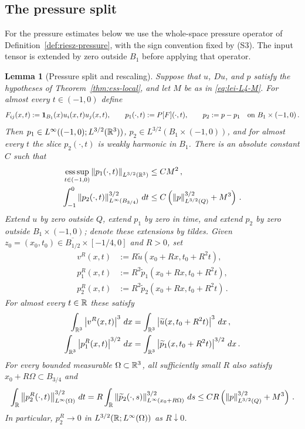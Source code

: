 \documentclass[11pt,letterpaper]{article}
\numberwithin{equation}{section}
\theoremstyle{plain}
\newtheorem{lemma}[theorem]{Lemma}
\theoremstyle{definition}
\theoremstyle{remark}
\begin{document}
\subsection{The pressure split}

For the pressure estimates below we use the whole-space pressure operator of Definition~\ref{def:riesz-pressure}, with the sign convention fixed by (S3). The input tensor is extended by zero outside $B_1$ before applying that operator.

\begin{lemma}[Pressure split and rescaling]\label{lem:pressure-split}
Suppose that $u$, $Du$, and $p$ satisfy the hypotheses of Theorem~\ref{thm:ess-local}, and let $M$ be as in \eqref{eq:lei-L4-M}. For almost every $t\in(-1,0)$ define
\begin{equation}\label{eq:pressure-split-defs}
F_{ij}(x,t):=\mathbf1_{B_1}(x)u_i(x,t)u_j(x,t),\qquad
p_1(\cdot,t):=P[F](\cdot,t),\qquad
p_2:=p-p_1\quad\hbox{on }B_1\times(-1,0)\,.
\end{equation}
Then $p_1\in L^\infty((-1,0);L^{3/2}(\mathbb{R}^3))$, $p_2\in L^{3/2}(B_1\times(-1,0))$, and for almost every $t$ the slice $p_2(\cdot,t)$ is weakly harmonic in $B_1$. There is an absolute constant $C$ such that
\begin{align}\label{eq:pressure-split-bounds}
\operatorname*{ess\,sup}_{t\in(-1,0)}\left\lVert p_1(\cdot,t)\right\rVert_{L^{3/2}(\mathbb{R}^3)}&\le CM^2\,,\notag\\
\int_{-1}^0\left\lVert p_2(\cdot,t)\right\rVert_{L^\infty(B_{3/4})}^{3/2}\,dt
&\le C\left(\left\lVert p\right\rVert_{L^{3/2}(Q)}^{3/2}+M^3\right)\,.
\end{align}
Extend $u$ by zero outside $Q$, extend $p_1$ by zero in time, and extend $p_2$ by zero outside $B_1\times(-1,0)$; denote these extensions by tildes. Given $z_0=(x_0,t_0)\in\overline{B_{1/2}}\times[-1/4,0]$ and $R>0$, set
\begin{equation}\label{eq:pressure-split-rescalings}
\begin{aligned}
v^R(x,t)&:=R\widetilde u(x_0+Rx,t_0+R^2t),\\
p_1^R(x,t)&:=R^2\widetilde p_1(x_0+Rx,t_0+R^2t),\\
p_2^R(x,t)&:=R^2\widetilde p_2(x_0+Rx,t_0+R^2t)\,.
\end{aligned}
\end{equation}
For almost every $t\in\mathbb{R}$ these satisfy
\begin{align}\label{eq:pressure-split-scaling}
\int_{\mathbb{R}^3}\left\lvert v^R(x,t)\right\rvert^3\,dx
 &=\int_{\mathbb{R}^3}\left\lvert \widetilde u(x,t_0+R^2t)\right\rvert^3\,dx\,,\notag\\
\int_{\mathbb{R}^3}\left\lvert p_1^R(x,t)\right\rvert^{3/2}\,dx
 &=\int_{\mathbb{R}^3}\left\lvert \widetilde p_1(x,t_0+R^2t)\right\rvert^{3/2}\,dx\,.
\end{align}
For every bounded measurable $\Omega\subset\mathbb{R}^3$, all sufficiently small $R$ also satisfy $x_0+R\Omega\subset B_{3/4}$ and
\begin{equation}\label{eq:pressure-split-p2-scaling}
\int_{\mathbb{R}}\left\lVert p_2^R(\cdot,t)\right\rVert_{L^\infty(\Omega)}^{3/2}\,dt
=R\int_{\mathbb{R}}\left\lVert \widetilde p_2(\cdot,s)\right\rVert_{L^\infty(x_0+R\Omega)}^{3/2}\,ds
\le CR\left(\left\lVert p\right\rVert_{L^{3/2}(Q)}^{3/2}+M^3\right)\,.
\end{equation}
In particular, $p_2^R\to0$ in $L^{3/2}(\mathbb{R};L^\infty(\Omega))$ as $R\downarrow0$.
\end{lemma}
\end{document}
